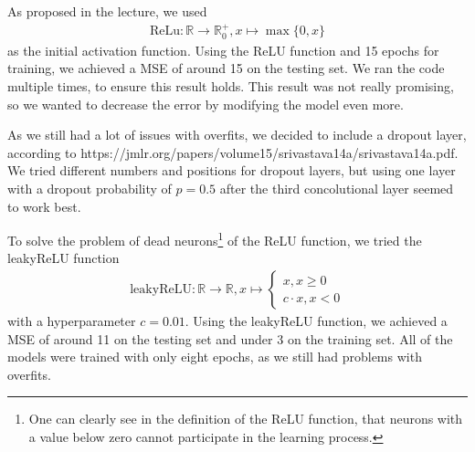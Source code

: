 \documentclass[conference]{IEEEtran}
\begin{document}
As proposed in the lecture, we used
\begin{align*}
\mathrm{ReLu}: \mathbb{R} \to \mathbb{R}_0^+, x \mapsto \max\{0,x\}
\end{align*}
as the initial activation function. Using the ReLU function and 15 epochs for training, we achieved a MSE of around 15 on the 
testing set. We ran the 
code multiple times, to ensure this result holds. This result was not really promising, so we wanted to decrease the error by 
modifying the model even more.

As we still had a lot of issues with overfits, we decided to include a dropout layer, according to https://jmlr.org/papers/volume15/srivastava14a/srivastava14a.pdf. We tried different numbers and positions for dropout layers, but using one layer with a dropout 
probability of $p=0.5$ after the third concolutional layer seemed to work best.

To solve the problem of dead neurons\footnote{One can clearly see in the definition of the ReLU 
function, that neurons with a value below zero cannot participate in the learning process.} of the ReLU function, we 
tried the leakyReLU function
\begin{align*}
\mathrm{leakyReLU} : \mathbb{R} \to \mathbb{R}, x \mapsto \begin{cases}
x, x \geq 0\\
c \cdot x, x <0
\end{cases}
\end{align*}
with a hyperparameter $c = 0.01$. Using the leakyReLU function, we achieved a MSE of around 11 on the testing set and under 3 on the 
training set. All of the models were trained with only eight epochs, as we still had problems with overfits.
\end{document}
